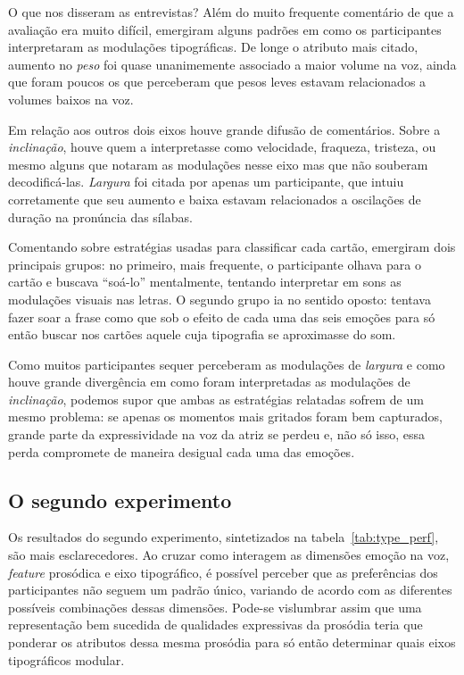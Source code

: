 \documentclass[a4paper]{tufte-handout}
\begin{document}
O que nos disseram as entrevistas? Além do muito frequente comentário de que a avaliação era muito difícil, emergiram alguns padrões em como os participantes interpretaram as modulações tipográficas. De longe o atributo mais citado, aumento no \textit{peso} foi quase unanimemente associado a maior volume na voz, ainda que foram poucos os que perceberam que pesos leves estavam relacionados a volumes baixos na voz.

Em relação aos outros dois eixos houve grande difusão de comentários. Sobre a \textit{inclinação}, houve quem a interpretasse como velocidade, fraqueza, tristeza, ou mesmo alguns que notaram as modulações nesse eixo mas que não souberam decodificá-las. \textit{Largura} foi citada por apenas um participante, que intuiu corretamente que seu aumento e baixa estavam relacionados a oscilações de duração na pronúncia das sílabas.

Comentando sobre estratégias usadas para classificar cada cartão, emergiram dois principais grupos: no primeiro, mais frequente, o participante olhava para o cartão e buscava ``soá-lo'' mentalmente, tentando interpretar em sons as modulações visuais nas letras. O segundo grupo ia no sentido oposto: tentava fazer soar a frase como que sob o efeito de cada uma das seis emoções para só então buscar nos cartões aquele cuja tipografia se aproximasse do som.

Como muitos participantes sequer perceberam as modulações de \textit{largura} e como houve grande divergência em como foram interpretadas as modulações de \textit{inclinação}, podemos supor que ambas as estratégias relatadas sofrem de um mesmo problema: se apenas os momentos mais gritados foram bem capturados, grande parte da expressividade na voz da atriz se perdeu e, não só isso, essa perda compromete de maneira desigual cada uma das emoções.

\subsection{O segundo experimento}

Os resultados do segundo experimento, sintetizados na tabela~\ref{tab:type_perf}, são mais esclarecedores. Ao cruzar como interagem as dimensões emoção na voz, \textit{feature} prosódica e eixo tipográfico, é possível perceber que as preferências dos participantes não seguem um padrão único, variando de acordo com as diferentes possíveis combinações dessas dimensões. Pode-se vislumbrar assim que uma representação bem sucedida de qualidades expressivas da prosódia teria que ponderar os atributos dessa mesma prosódia para só então determinar quais eixos tipográficos modular.
\end{document}
